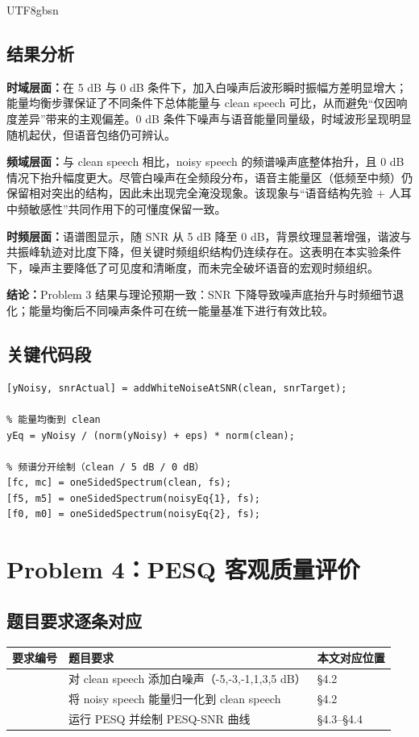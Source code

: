 \documentclass[12pt,a4paper]{article}
\begin{document}
\begin{CJK*}{UTF8}{gbsn}
\subsection{结果分析}
\textbf{时域层面：}在 5 dB 与 0 dB 条件下，加入白噪声后波形瞬时振幅方差明显增大；能量均衡步骤保证了不同条件下总体能量与 clean speech 可比，从而避免“仅因响度差异”带来的主观偏差。0 dB 条件下噪声与语音能量同量级，时域波形呈现明显随机起伏，但语音包络仍可辨认。

\textbf{频域层面：}与 clean speech 相比，noisy speech 的频谱噪声底整体抬升，且 0 dB 情况下抬升幅度更大。尽管白噪声在全频段分布，语音主能量区（低频至中频）仍保留相对突出的结构，因此未出现完全淹没现象。该现象与“语音结构先验 + 人耳中频敏感性”共同作用下的可懂度保留一致。

\textbf{时频层面：}语谱图显示，随 SNR 从 5 dB 降至 0 dB，背景纹理显著增强，谐波与共振峰轨迹对比度下降，但关键时频组织结构仍连续存在。这表明在本实验条件下，噪声主要降低了可见度和清晰度，而未完全破坏语音的宏观时频组织。

\textbf{结论：}Problem 3 结果与理论预期一致：SNR 下降导致噪声底抬升与时频细节退化；能量均衡后不同噪声条件可在统一能量基准下进行有效比较。

\subsection{关键代码段}
\begin{lstlisting}[caption={Problem 3 加噪、均衡与频谱分开绘制}]
% 按目标 SNR 加白噪
[yNoisy, snrActual] = addWhiteNoiseAtSNR(clean, snrTarget);

% 能量均衡到 clean
yEq = yNoisy / (norm(yNoisy) + eps) * norm(clean);

% 频谱分开绘制（clean / 5 dB / 0 dB）
[fc, mc] = oneSidedSpectrum(clean, fs);
[f5, m5] = oneSidedSpectrum(noisyEq{1}, fs);
[f0, m0] = oneSidedSpectrum(noisyEq{2}, fs);
\end{lstlisting}

\section{Problem 4：PESQ 客观质量评价}

\subsection{题目要求逐条对应}
\begin{table}[H]
\centering
\begin{tabular}{>{\centering\arraybackslash}p{1.3cm}p{9.8cm}p{3.2cm}}
\toprule
要求编号 & 题目要求 & 本文对应位置 \\
\midrule
1 & 对 clean speech 添加白噪声（-5,-3,-1,1,3,5 dB） & \S4.2 \\
2 & 将 noisy speech 能量归一化到 clean speech & \S4.2 \\
3 & 运行 PESQ 并绘制 PESQ-SNR 曲线 & \S4.3--\S4.4 \\
\bottomrule
\end{tabular}
\end{table}


\end{CJK*}
\end{document}
